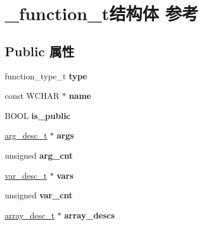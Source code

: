 \hypertarget{struct__function__t}{}\section{\+\_\+function\+\_\+t结构体 参考}
\label{struct__function__t}
\subsection*{Public 属性}
\begin{DoxyCompactItemize}
\item 
\mbox{\label{struct__function__t_a3386efff4b72f91d5d5f5d8774bc867e}} 
function\+\_\+type\+\_\+t {\bfseries type}
\item 
\mbox{\label{struct__function__t_aacec677ed8563502fc0e7c4763bcb475}} 
const W\+C\+H\+AR $\ast$ {\bfseries name}
\item 
\mbox{\label{struct__function__t_a4086a6403aa653d31cbd2cd650dd3bbe}} 
B\+O\+OL {\bfseries is\+\_\+public}
\item 
\mbox{\label{struct__function__t_a940243111e0d9e7d95bdbc744d93bce3}} 
\hyperlink{structarg__desc__t}{arg\+\_\+desc\+\_\+t} $\ast$ {\bfseries args}
\item 
\mbox{\label{struct__function__t_a086d5c818bc32580de499f0d80c1f587}} 
unsigned {\bfseries arg\+\_\+cnt}
\item 
\mbox{\label{struct__function__t_a548852a05de7e3e834fca87a68aa2ebe}} 
\hyperlink{structvar__desc__t}{var\+\_\+desc\+\_\+t} $\ast$ {\bfseries vars}
\item 
\mbox{\label{struct__function__t_a78cad83ba2b1f5ec8701f49c80e6a098}} 
unsigned {\bfseries var\+\_\+cnt}
\item 
\mbox{\label{struct__function__t_a69404056fddd5030080c7494ea99f2b8}} 
\hyperlink{structarray__desc__t}{array\+\_\+desc\+\_\+t} $\ast$ {\bfseries array\+\_\+descs}
\item 
\mbox{\label{struct__function__t_ada8ab05193c8b737370bd7e5f7026a44}} 

\end{DoxyCompactItemize}
